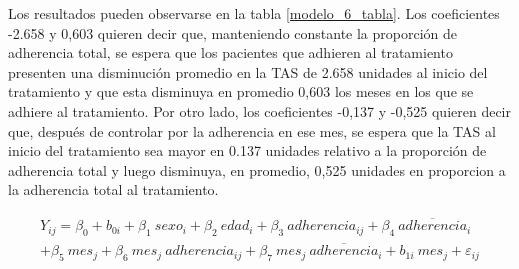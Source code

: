 \documentclass[spanish]{article}
\numberwithin{figure}{subsection}
\numberwithin{equation}{subsection}
\numberwithin{table}{subsection}
\begin{document}
Los resultados pueden observarse en la tabla \ref{modelo_6_tabla}. Los
coeficientes -2.658 y 0,603 quieren decir que, manteniendo constante la
proporción de adherencia total, se espera que los pacientes que adhieren al
tratamiento presenten una disminución promedio en la TAS de 2.658 unidades al
inicio del tratamiento y que esta disminuya en promedio 0,603 los meses en los
que se adhiere al tratamiento. Por otro lado, los coeficientes -0,137 y -0,525
quieren decir que, después de controlar por la adherencia en ese mes, se espera
que la TAS al inicio del tratamiento sea mayor en 0.137 unidades relativo a la
proporción de adherencia total y luego disminuya, en promedio, 0,525 unidades en
proporcion a la adherencia total al tratamiento.


\begin{multline}
	\label{modelo_6}
	Y_{ij} = \beta_0 + b_{0i} + \beta_1\ sexo_i + \beta_2\ edad_i + \beta_{3}\ adherencia_{ij} + \beta_4\ \overline{adherencia}_i \\
	+ \beta_5\ mes_j + \beta_6\ mes_j\ adherencia_{ij} + \beta_7\ mes_j\ \overline{adherencia}_i + b_{1i}\ mes_j + \varepsilon_{ij}
\end{multline}
\end{document}
